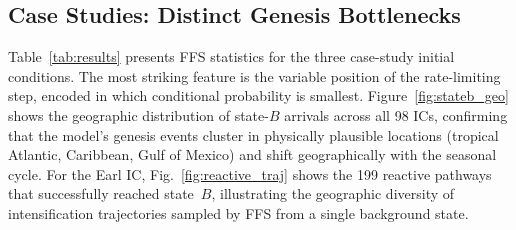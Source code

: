 \documentclass[11pt]{article}
\begin{document}
\subsection{Case Studies: Distinct Genesis Bottlenecks}
\begin{table}[htbp]
\centering
\caption{FFS statistics for three case-study initial conditions.
$\Phi_{A,0}$: flux rate. $P_i$: conditional crossing probability at interface $\lambda_i$.
$k^{\text{FFS}}$: full genesis rate (Eq.~\ref{eq:ffs_rate}). $k^{\text{direct}}$:
independent direct-sampling rate. Ratio: $k^{\text{FFS}}/k^{\text{direct}}$.
Speedup: enhancement over direct sampling for equivalent 20\% rate uncertainty.
Bottom row: statistics across all 98 ICs.}
\label{tab:results}
\end{table}
Table~\ref{tab:results} presents FFS statistics for the three case-study initial
conditions. The most striking feature is the variable position of the rate-limiting
step, encoded in which conditional probability is smallest.
Figure~\ref{fig:stateb_geo} shows the geographic distribution of state-$B$ arrivals
across all 98 ICs, confirming that the model's genesis events cluster in physically
plausible locations (tropical Atlantic, Caribbean, Gulf of Mexico) and shift
geographically with the seasonal cycle.
For the Earl IC, Fig.~\ref{fig:reactive_traj} shows the 199 reactive
pathways that successfully reached state~$B$, illustrating the geographic diversity
of intensification trajectories sampled by FFS from a single background state.
\end{document}
